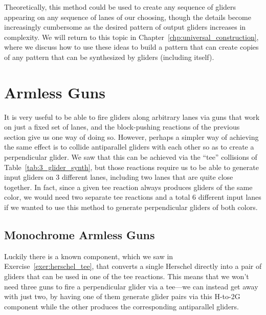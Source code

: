 Theoretically, this method could be used to create any sequence of gliders appearing on any sequence of lanes of our choosing, though the details become increasingly cumbersome as the desired pattern of output gliders increases in complexity. We will return to this topic in Chapter~\ref{chp:universal_construction}, where we discuss how to use these ideas to build a pattern that can create copies of any pattern that can be synthesized by gliders (including itself).


\section{Armless Guns}\label{sec:armless}

It is very useful to be able to fire gliders along arbitrary lanes via guns that work on just a fixed set of lanes, and the block-pushing reactions of the previous section give us one way of doing so. However, perhaps a simpler way of achieving the same effect is to collide antiparallel gliders with each other so as to create a perpendicular glider. We saw that this can be achieved via the ``tee'' collisions of Table~\ref{tab:3_glider_synth}, but those reactions require us to be able to generate input gliders on $3$ different lanes, including two lanes that are quite close together. In fact, since a given tee reaction always produces gliders of the same color, we would need two separate tee reactions and a total $6$ different input lanes if we wanted to use this method to generate perpendicular gliders of both colors.


\subsection{Monochrome Armless Guns}\label{sec:monochrome_armless_guns}

Luckily there is a known component, which we saw in Exercise~\ref{exer:herschel_tee}, that converts a single Herschel directly into a pair of gliders that can be used in one of the tee reactions. This means that we won't need three guns to fire a perpendicular glider via a tee---we can instead get away with just two, by having one of them generate glider pairs via this H-to-2G component while the other produces the corresponding antiparallel gliders.

